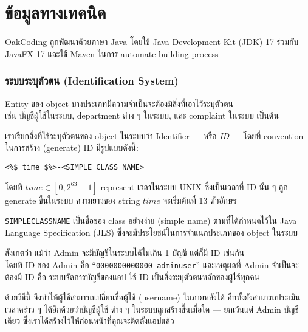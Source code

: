 \clearpage

\section*{ข้อมูลทางเทคนิค}

OakCoding ถูกพัฒนาด้วยภาษา Java โดยใช้ Java Development Kit (JDK) 17
\mbox{ร่วมกับ} JavaFX 17 และใช้ \href{https://maven.apache.org/}{Maven} ในการ automate building process

\subsubsection*{ระบบระบุตัวตน (Identification System)}

Entity ของ object บางประเภทมีความจำเป็นจะต้องมีสิ่งที่เอาไว้ระบุตัวตน\\
เช่น บัญชีผู้ใช้ในระบบ, department ต่าง ๆ ในระบบ, และ complaint ในระบบ เป็นต้น

เราเรียกสิ่งที่ใช้ระบุตัวตนของ object ในระบบว่า Identifier --- หรือ \emph{ID} --- โดยที่ convention
ในการสร้าง (generate) ID มีรูปแบบดังนี้:

\begin{lstlisting}[numbers=none,rulecolor=\oakrulecolor]
<%$ time $%>-<SIMPLE_CLASS_NAME>
\end{lstlisting}

โดยที่ $time \in [0, 2^{63}-1]$ represent เวลาในระบบ UNIX ซึ่งเป็นเวลาที่
ID นั้น ๆ ถูก generate ขึ้นในระบบ ความยาวของ string $time$ จะเริ่มต้นที่ 13 ตัวอักษร

\texttt{SIMPLE\textunderscore{}CLASS\textunderscore{}NAME} เป็นชื่อของ class อย่างง่าย (simple name) ตามที่ได้กำหนดไว้ใน
Java Language Specification (JLS) \mbox{\cite[JSL \S 6.2]{jsl-6.2}} ซึ่งจะมีประโยชน์ในการจำแนกประเภทของ object
ในระบบ

สังเกตว่า แม้ว่า Admin จะมีบัญชีในระบบได้ไม่เกิน 1 บัญชี แต่ก็มี ID เช่นกัน\\
โดยที่ ID ของ Admin คือ ``\texttt{0000000000000-adminuser}''
และเหตุผลที่ Admin จำเป็นจะต้องมี ID คือ ระบบจัดการบัญชีของแอป
ใช้ ID เป็นสิ่งระบุตัวตนหลักของ\mbox{ผู้ใช้}ทุกคน

ด้วยวิธีนี้ จึงทำให้ผู้ใช้สามารถเปลี่ยนชื่อผู้ใช้ (username) ในภายหลังได้
อีกทั้งยังสามารถประเมินเวลาคร่าว ๆ ได้อีกด้วยว่าบัญชีผู้ใช้
ต่าง ๆ ในระบบถูกสร้างขึ้นเมื่อใด --- ยกเว้นแต่ Admin บัญชีเดียว
ซึ่งเราได้สร้างไว้ให้ก่อนหน้าที่คุณจะติดตั้งแอปแล้ว

